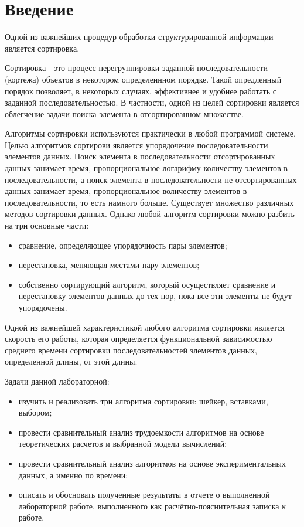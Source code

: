 \chapter*{Введение}

Одной из важнейших процедур обработки структурированной информации является сортировка.

Сортировка - это процесс перегруппировки заданной последовательности (кортежа) объектов в некотором определеннном порядке. Такой опредленный порядок позволяет, в некоторых случаях, эффективнее и удобнее работать с заданной последовательностью. В частности, одной из целей сортировки является облегчение задачи поиска элемента в отсортированном множестве. 

Алгоритмы сортировки используются практически в любой программой системе. Целью алгоритмов сортирови является упорядочение последовательности элементов данных. Поиск элемента в последовательности отсортированных данных занимает время, пропорциональное логарифму количеству элементов в последовательности, а поиск элемента в последовательности не отсортированных данных занимает время, пропорциональное воличеству элементов в последовательности, то есть намного больше. Существует множество различных методов сортировки данных. Однако любой алгоритм сортировки можно разбить на три основные части:

\begin{itemize}
	\item сравнение, определяющее упорядочность пары элементов;
	\item перестановка, меняющая местами пару элементов;
	\item собственно сортирующий алгоритм, который осуществляет сравнение
	и перестановку элементов данных до тех пор, пока все эти элементы
	не будут упорядочены.
\end{itemize}

Одной из важнейшей характеристикой любого алгоритма сортировки является скорость его работы, которая определяется функциональной зависимостью среднего времени сортировки последовательностей элементов данных, определенной длины, от этой длины.


Задачи данной лабораторной:

\begin{itemize}
	\item изучить и реализовать три алгоритма сортировки: шейкер, вставками, выбором;
	\item провести сравнительный анализ трудоемкости алгоритмов на основе теоретических расчетов и выбранной модели вычислений;
	\item провести сравнительный анализ алгоритмов на основе экспериментальных данных, а именно по времени;
	\item описать и обосновать полученные результаты в отчете о выполненной лабораторной работе, выполненного как расчётно-пояснительная записка к работе.
\end{itemize}
